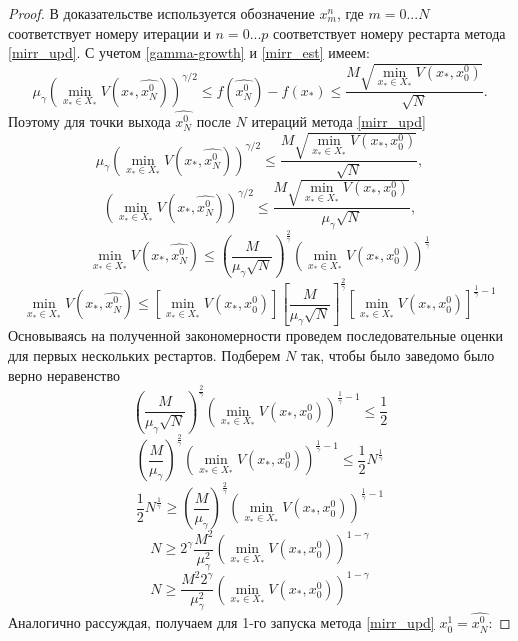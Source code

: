     \begin{proof}
       В доказательстве используется обозначение $x_m^n$, где $m = 0...N$ соответствует номеру итерации и $n = 0...p$ соответствует номеру рестарта метода \eqref{mirr_upd}. С учетом \eqref{gamma-growth} и \eqref{mirr_est} имеем: 
       $$
           \mu_{\gamma}\left(\min\limits_{x_* \in X_*}{V(x_*, \widehat{x_N^0})}\right)^{\gamma/2} \leq f(\widehat{x_N^0}) - f(x_*) \leq \frac{M\sqrt{\min\limits_{x_* \in X_*}{V(x_*, x_0^0)}}}{\sqrt{N}}.
       $$
       Поэтому для точки выхода $\widehat{x_N^0}$ после $N$ итераций метода \eqref{mirr_upd}
       $$
           \mu_{\gamma}\left(\min\limits_{x_* \in X_*}{V(x_*, \widehat{x_N^0})}\right)^{\gamma/2} \leq \frac{M\sqrt{\min\limits_{x_* \in X_*}{V(x_*, x_0^0)}}}{\sqrt{N}},
       $$
       $$
           \left(\min\limits_{x_* \in X_*}{V(x_*, \widehat{x_N^0})}\right)^{\gamma/2} \leq \frac{M\sqrt{\min\limits_{x_* \in X_*}{V(x_*, x_0^0)}}}{\mu_{\gamma}\sqrt{N}},
       $$
       $$
           \min\limits_{x_* \in X_*}{V(x_*, \widehat{x_N^0})} \leq \left(\frac{M}{\mu_{\gamma}\sqrt{N}}\right)^{\frac{2}{\gamma}} \left(\min\limits_{x_* \in X_*}{V(x_*, x_0^0)}\right)^{\frac{1}{\gamma}}
       $$
       $$
           \min\limits_{x_* \in X_*}{V(x_*, \widehat{x_N^0})} \leq \left[\min\limits_{x_* \in X_*}{V(x_*, x_0^0)} \right] \left[\frac{M}{\mu_{\gamma}\sqrt{N}}\right]^{\frac{2}{\gamma}} \left[\min\limits_{x_* \in X_*}{V(x_*, x_0^0)}\right]^{\frac{1}{\gamma} - 1}
       $$
       Основываясь на полученной закономерности проведем последовательные оценки для первых нескольких рестартов. Подберем $N$ так, чтобы было заведомо было верно неравенство
       $$
           \left(\frac{M}{\mu_{\gamma}\sqrt{N}}\right)^{\frac{2}{\gamma}} \left(\min\limits_{x_* \in X_*}{V(x_*, x_0^0)}\right)^{\frac{1}{\gamma} - 1} \leq \frac{1}{2} 
       $$
       $$
           \left(\frac{M}{\mu_{\gamma}}\right)^{\frac{2}{\gamma}} \left(\min\limits_{x_* \in X_*}{V(x_*, x_0^0)}\right)^{\frac{1}{\gamma} - 1} \leq \frac{1}{2} N^{\frac{1}{\gamma}} 
       $$
       $$
           \frac{1}{2} N^{\frac{1}{\gamma}} \geq \left(\frac{M}{\mu_{\gamma}}\right)^{\frac{2}{\gamma}} \left(\min\limits_{x_* \in X_*}{V(x_*, x_0^0)}\right)^{\frac{1}{\gamma} - 1}  
       $$
       $$
           N \geq 2 ^ {\gamma} \frac{M^2}{\mu_{\gamma}^2} \left(\min\limits_{x_* \in X_*}{V(x_*, x_0^0)}\right)^{1 - \gamma}  
       $$
       $$
           N \geq \frac{M^2 2^{\gamma}}{\mu_{\gamma}^2} \left(\min\limits_{x_* \in X_*}{V(x_*, x_0^0)}\right)^{1 - \gamma}  
       $$
       Аналогично рассуждая, получаем для 1-го запуска метода \eqref{mirr_upd} $x_0^1 = \widehat{x_N^0}$:

\end{proof}
